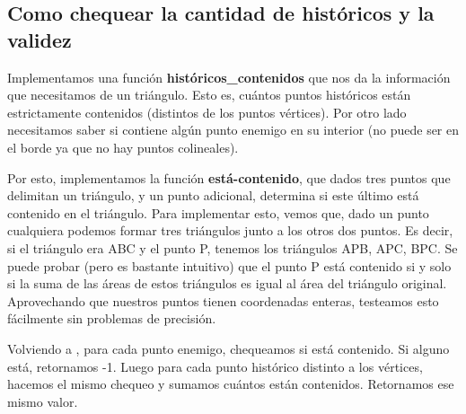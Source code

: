 \subsection{Como chequear la cantidad de históricos y la validez}
\par{Implementamos una función \textbf{históricos_contenidos} que nos da la información que necesitamos de un triángulo. Esto es, cuántos puntos históricos están estrictamente contenidos (distintos de los puntos vértices). Por otro lado necesitamos saber si contiene algún punto enemigo en su interior (no puede ser en el borde ya que no hay puntos colineales). } \newline
\par{Por esto, implementamos la función \textbf{está-contenido}, que dados tres puntos que delimitan un triángulo, y un punto adicional, determina si este último está contenido en el triángulo. Para implementar esto, vemos que, dado un punto cualquiera podemos formar tres triángulos junto a los otros dos puntos. 
Es decir, si el triángulo era ABC y el punto P, tenemos los triángulos APB, APC, BPC. Se puede probar (pero es bastante intuitivo) que el punto P está contenido si y solo si
la suma de las áreas de estos triángulos es igual al área del triángulo original. Aprovechando que nuestros puntos tienen coordenadas enteras, testeamos esto fácilmente sin problemas de precisión.} \newline

\par{Volviendo a , para cada punto enemigo, chequeamos si está contenido. Si alguno está, retornamos -1. Luego para cada punto histórico distinto a los vértices, hacemos el mismo chequeo y sumamos cuántos están contenidos. Retornamos ese mismo valor.} \newline

